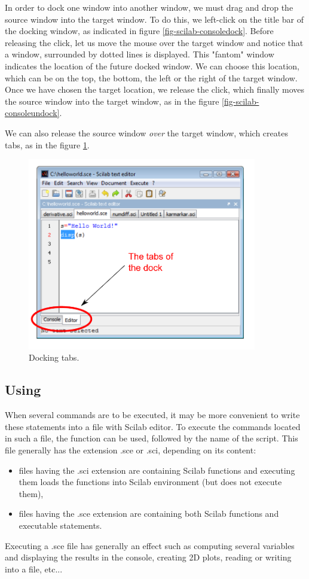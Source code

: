 In order to dock one window into another window, we must drag and 
drop the source window into the target window. To do this, we 
left-click on the title bar of the docking window, as indicated 
in figure \ref{fig-scilab-consoledock}. Before releasing the 
click, let us move the mouse over the target window and notice that 
a window, surrounded by dotted lines is displayed. This "fantom" 
window indicates the location of the future docked window. We can 
choose this location, which can be on the top, the bottom, the left
or the right of the target window. Once we have chosen the target location,
we release the click, which finally moves the source window into the 
target window, as in the figure \ref{fig-scilab-consoleundock}.

We can also release the source window \emph{over} the target window,
which creates tabs, as in the figure \ref{fig-scilab-docktabs}.

\begin{figure}
\begin{center}
\includegraphics[width=10cm]{introscilab/console-docktabs.pdf}
\end{center}
\caption{Docking tabs.}
\label{fig-scilab-docktabs}
\end{figure}

\subsection{Using }
When several commands are to be executed, it may be 
more convenient to write these statements into a file with
Scilab editor.
To execute the commands located in such a file, the 
function can be used, followed by the name of the script.
This file generally has the extension .sce or .sci, depending
on its content: 
\begin{itemize}
\item files having the .sci extension are containing Scilab functions and 
executing them loads the functions into Scilab environment (but does not 
execute them),
\item files having the .sce extension are containing both Scilab functions and 
executable statements.
\end{itemize}
Executing a .sce file has generally an effect such 
as computing several variables and displaying the results in the console, 
creating 2D plots, reading or writing into a file, etc...

